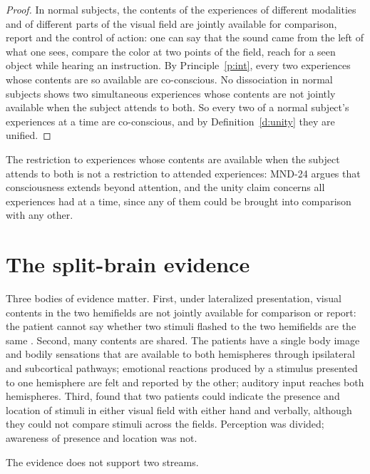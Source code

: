 \documentclass{situationist-preprint}
\begin{document}
\begin{proof}
In normal subjects, the contents of the experiences of different modalities and of different parts of the visual field are jointly available for comparison, report and the control of action: one can say that the sound came from the left of what one sees, compare the color at two points of the field, reach for a seen object while hearing an instruction. By Principle~\ref{p:int}, every two experiences whose contents are so available are co-conscious. No dissociation in normal subjects shows two simultaneous experiences whose contents are not jointly available when the subject attends to both. So every two of a normal subject's experiences at a time are co-conscious, and by Definition~\ref{d:unity} they are unified.
\end{proof}

The restriction to experiences whose contents are available when the subject attends to both is not a restriction to attended experiences: MND-24 argues that consciousness extends beyond attention, and the unity claim concerns all experiences had at a time, since any of them could be brought into comparison with any other.

\section{The split-brain evidence}

Three bodies of evidence matter. First, under lateralized presentation, visual contents in the two hemifields are not jointly available for comparison or report: the patient cannot say whether two stimuli flashed to the two hemifields are the same \citep{Gazzaniga2005}. Second, many contents are shared. The patients have a single body image and bodily sensations that are available to both hemispheres through ipsilateral and subcortical pathways; emotional reactions produced by a stimulus presented to one hemisphere are felt and reported by the other; auditory input reaches both hemispheres. Third, \citet{Pinto2017} found that two patients could indicate the presence and location of stimuli in either visual field with either hand and verbally, although they could not compare stimuli across the fields. Perception was divided; awareness of presence and location was not.

\begin{lemma}\label{l:not2}
The evidence does not support two streams.
\end{lemma}
\end{document}

